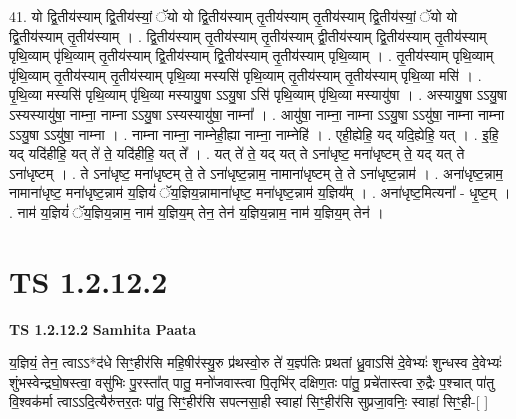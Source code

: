 \documentclass[17pt]{extarticle}
\begin{document}
41. यो द्वि॒तीय॑स्याम् द्वि॒तीय॑स्यां॒ ॅयो यो द्वि॒तीय॑स्याम् तृ॒तीय॑स्याम् तृ॒तीय॑स्याम् द्वि॒तीय॑स्यां॒ ॅयो यो द्वि॒तीय॑स्याम् तृ॒तीय॑स्याम् । . द्वि॒तीय॑स्याम् तृ॒तीय॑स्याम् तृ॒तीय॑स्याम् द्वी॒तीय॑स्याम् द्वि॒तीय॑स्याम् तृ॒तीय॑स्याम् पृथि॒व्याम् पृ॑थि॒व्याम् तृ॒तीय॑स्याम् द्वि॒तीय॑स्याम् द्वि॒तीय॑स्याम् तृ॒तीय॑स्याम् पृथि॒व्याम् । . तृ॒तीय॑स्याम् पृथि॒व्याम् पृ॑थि॒व्याम् तृ॒तीय॑स्याम् तृ॒तीय॑स्याम् पृथि॒व्या मस्यसि॑ पृथि॒व्याम् तृ॒तीय॑स्याम् तृ॒तीय॑स्याम् पृथि॒व्या मसि॑ । . पृ॒थि॒व्या मस्यसि॑ पृथि॒व्याम् पृ॑थि॒व्या मस्यायु॒षा ऽऽयु॒षा ऽसि॑ पृथि॒व्याम् पृ॑थि॒व्या मस्यायु॑षा । . अस्यायु॒षा ऽऽयु॒षा ऽस्यस्यायु॑षा॒ नाम्ना॒ नाम्ना ऽऽयु॒षा ऽस्यस्यायु॑षा॒ नाम्ना᳚ । . आयु॑षा॒ नाम्ना॒ नाम्ना ऽऽयु॒षा ऽऽयु॑षा॒ नाम्ना नाम्ना ऽऽयु॒षा ऽऽयु॑षा॒ नाम्ना । . नाम्ना नाम्ना॒ नाम्नेही॒ह्या नाम्ना॒ नाम्नेहि॑ । . एही॒ह्येहि॒ यद् यदि॒ह्येहि॒ यत् । . इ॒हि॒ यद् यदि॑हीहि॒ यत् ते॑ ते॒ यदि॑हीहि॒ यत् ते᳚ । . यत् ते॑ ते॒ यद् यत् ते ऽना॑धृष्ट॒ मना॑धृष्टम् ते॒ यद् यत् ते ऽना॑धृष्टम् । . ते ऽना॑धृष्ट॒ मना॑धृष्टम् ते॒ ते ऽना॑धृष्ट॒न्नाम॒ नामाना॑धृष्टम् ते॒ ते ऽना॑धृष्ट॒न्नाम॑ । . अना॑धृष्ट॒न्नाम॒ नामाना॑धृष्ट॒ मना॑धृष्ट॒न्नाम॑ य॒ज्ञियं॑ ॅय॒ज्ञिय॒न्नामाना॑धृष्ट॒ मना॑धृष्ट॒न्नाम॑ य॒ज्ञिय᳚म् । . अना॑धृष्ट॒मित्यना᳚ - धृ॒ष्ट॒म् । . नाम॑ य॒ज्ञियं॑ ॅय॒ज्ञिय॒न्नाम॒ नाम॑ य॒ज्ञिय॒म् तेन॒ तेन॑ य॒ज्ञिय॒न्नाम॒ नाम॑ य॒ज्ञिय॒म् तेन॑ । \newline
\pagebreak
{}
\section*{ TS 1.2.12.2 }

\textbf{TS 1.2.12.2 } \newline
\textbf{Samhita Paata} \newline

य॒ज्ञियं॒ तेन॒ त्वाऽऽ*द॑धे सिꣳ॒॒हीर॑सि महि॒षीर॑स्यु॒रु प्र॑थस्वो॒रु ते॑ य॒ज्ञ्प॑तिः प्रथतां ध्रु॒वाऽसि॑ दे॒वेभ्यः॑ शुन्धस्व दे॒वेभ्यः॑ शुंभस्वेन्द्रघो॒षस्त्वा॒ वसु॑भिः पु॒रस्ता᳚त् पातु॒ मनो॑जवास्त्वा पि॒तृभि॑र् दक्षिण॒तः पा॑तु॒ प्रचे॑तास्त्वा रु॒द्रैः प॒श्चात् पा॑तु वि॒श्वक॑र्मा त्वाऽऽदि॒त्यैरु॑त्तर॒तः पा॑तु॒ सिꣳ॒॒हीर॑सि सपत्नसा॒ही स्वाहा॑ सिꣳ॒॒हीर॑सि सुप्रजा॒वनिः॒ स्वाहा॑ सिꣳ॒॒ही-[ ] \newline
\end{document}

